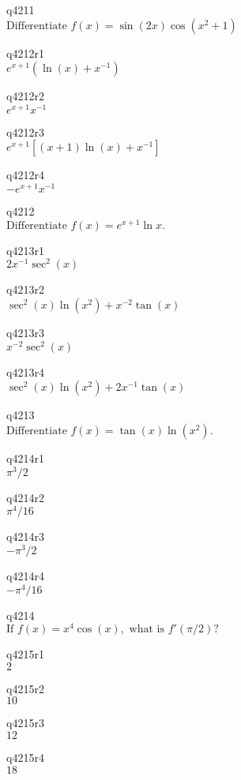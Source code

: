 q4211\\
\(\displaystyle \text{Differentiate } f(x) = \sin(2x) \cos(x^2+1) \)

q4212r1\\
\(\displaystyle e^{x+1}( \ln(x) + x^{-1}) \)

q4212r2\\
\(\displaystyle e^{x+1} x^{-1} \)

q4212r3\\
\(\displaystyle e^{x+1} [ (x+1) \ln(x) + x^{-1}] \)

q4212r4\\
\(\displaystyle -e^{x+1} x^{-1} \)

q4212\\
\(\displaystyle \text{Differentiate } f(x) = e^{x+1} \ln x. \)

q4213r1\\
\(\displaystyle 2x^{-1} \sec^2(x) \)

q4213r2\\
\(\displaystyle \sec^2(x)\ln(x^2) + x^{-2}\tan(x) \)

q4213r3\\
\(\displaystyle x^{-2} \sec^2(x) \)

q4213r4\\
\(\displaystyle \sec^2(x)\ln(x^2) + 2x^{-1}\tan(x) \)

q4213\\
\(\displaystyle \text{Differentiate } f(x) = \tan(x) \ln(x^2). \)

q4214r1\\
\(\displaystyle \pi^3/2 \)

q4214r2\\
\(\displaystyle \pi^4/16 \)

q4214r3\\
\(\displaystyle -\pi^3/2 \)

q4214r4\\
\(\displaystyle -\pi^4/16 \)

q4214\\
\(\displaystyle \text{If } f(x) = x^4 \cos(x), \text{ what is } f'(\pi/2)? \)

q4215r1\\
\(\displaystyle 2 \)

q4215r2\\
\(\displaystyle 10 \)

q4215r3\\
\(\displaystyle 12 \)

q4215r4\\
\(\displaystyle 18 \)

